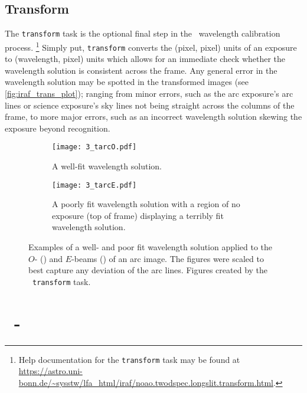 \subsection{Transform} \label{subsec:iraf_transform}

The \texttt{transform} task is the optional final step in the \iraf\ wavelength calibration process.%
\footnote{Help documentation for the \texttt{transform} task may be found at \url{https://astro.uni-bonn.de/~sysstw/lfa_html/iraf/noao.twodspec.longslit.transform.html}.}
Simply put, \texttt{transform} converts the (pixel, pixel) units of an exposure to (wavelength, pixel) units which allows for an immediate check whether the wavelength solution is consistent across the frame. Any general error in the wavelength solution may be spotted in the transformed images (see \autoref{fig:iraf_trans_plot}); ranging from minor errors, such as the arc exposure's arc lines or science exposure's sky lines not being straight across the columns of the frame, to more major errors, such as an incorrect wavelength solution skewing the exposure beyond recognition.

\begin{figure}
    \centering
    \begin{subfigure}[b]{1.0 \textwidth}
        \centering
        \texttt{[image: 3\_tarcO.pdf]}
        \caption{A well-fit wavelength solution.}
        \label{fig:trans_O}
    \end{subfigure}
    \centering
    \begin{subfigure}[b]{1.0\textwidth}
        \centering
        \texttt{[image: 3\_tarcE.pdf]}
        \caption{A poorly fit wavelength solution with a region of no exposure (top of frame) displaying a terribly fit wavelength solution.}
        \label{fig:trans_E}
    \end{subfigure}
    \caption{Examples of a well- and poor fit wavelength solution applied to the $O$- () and $E$-beams () of an arc image. The figures were scaled to best capture any deviation of the arc lines. Figures created by the \iraf\ \texttt{transform} task.}
    \label{fig:iraf_trans_plot}
\end{figure}

\section[\textsc{stops}]{\stops\ - } \label{sec:stops}

